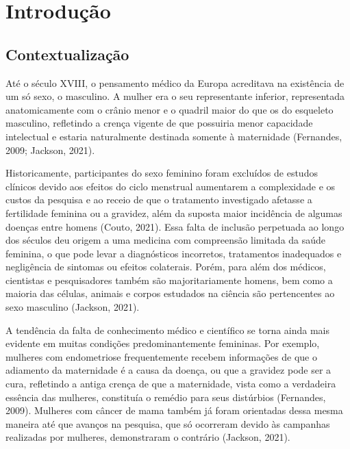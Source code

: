 \chapter{Introdução}\label{chp:Introducao}

\section{Contextualização}\label{sec:context}

Até o século XVIII, o pensamento médico da Europa acreditava na existência de um só sexo, o masculino. A mulher era o seu representante inferior, representada anatomicamente com o crânio menor e o quadril maior do que os do esqueleto masculino, refletindo a crença vigente de que possuiria menor capacidade intelectual e estaria naturalmente destinada somente à maternidade (Fernandes, 2009; Jackson, 2021). 

Historicamente, participantes do sexo feminino foram excluídos de estudos clínicos devido aos efeitos do ciclo menstrual aumentarem a complexidade e os custos da pesquisa e ao receio de que o tratamento investigado afetasse a fertilidade feminina ou a gravidez, além da suposta maior incidência de algumas doenças entre homens (Couto, 2021). Essa falta de inclusão perpetuada ao longo dos séculos deu origem a uma medicina com compreensão limitada da saúde feminina, o que pode levar a diagnósticos incorretos, tratamentos inadequados e negligência de sintomas ou efeitos colaterais. Porém, para além dos médicos, cientistas e pesquisadores também são majoritariamente homens, bem como a maioria das células, animais e corpos estudados na ciência são pertencentes ao sexo masculino (Jackson, 2021).

A tendência da falta de conhecimento médico e científico se torna ainda mais evidente em muitas condições predominantemente femininas. Por exemplo, mulheres com endometriose frequentemente recebem informações de que o adiamento da maternidade é a causa da doença, ou que a gravidez pode ser a cura, refletindo a antiga crença de que  a maternidade, vista como a verdadeira essência das mulheres, constituía o remédio para seus distúrbios (Fernandes, 2009). Mulheres com câncer de mama também já foram orientadas dessa mesma maneira até que avanços na pesquisa, que só ocorreram devido às campanhas realizadas por mulheres, demonstraram o contrário (Jackson, 2021).

